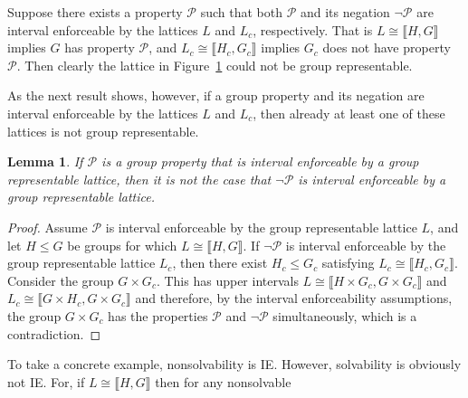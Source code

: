 \documentclass{gen-j-l}
\newcommand{\lb}{\ensuremath{\llbracket}}
\newcommand{\rb}{\ensuremath{\rrbracket}}
\newcommand{\<}{\ensuremath{\langle}}
\renewcommand{\>}{\ensuremath{\rangle}}
\theoremstyle{plain}
\newtheorem{lemma}[theorem]{Lemma}
\theoremstyle{definition}
\theoremstyle{remark}
\numberwithin{theorem}{section}
\numberwithin{claim}{section}
\numberwithin{equation}{section}
\numberwithin{conjecture}{section}
\renewcommand{\leq}{\ensuremath{\leqslant}}
\newcommand{\2}{\ensuremath{\mathbf{2}}}
\newcommand{\3}{\ensuremath{\mathbf{3}}}
\newcommand{\cP}{\ensuremath{\mathcal{P}}}
\newcommand{\IE}{{\small IE}}
\begin{document}
Suppose there exists a property $\cP$ such that both $\cP$ and
its negation $\neg \cP$ are interval enforceable by the lattices $L$ and $L_c$,
respectively.  That is $L\cong \lb H,G \rb$ implies $G$ has property $\cP$, and 
$L_c\cong \lb H_c,G_c \rb$ implies $G_c$ does not have property $\cP$.  
Then clearly the lattice in Figure~\ref{fig:twopanelchute} could not be group
representable.   
\begin{figure}[!h]
  \centering
{}
\caption{}
\label{fig:twopanelchute}  
\end{figure}
As the next result shows, however, if a group property and its
negation are interval enforceable by the lattices $L$ and $L_c$, then already
at least one of these lattices is not group representable.
\begin{lemma}
\label{lemma:ie-prop-and-neg}
  If $\cP$ is a group property that is interval enforceable by a group
  representable lattice, then it is not the case that $\neg \cP$ is interval
  enforceable by a group representable lattice. 
\end{lemma}
\begin{proof}
Assume $\cP$ is 
interval enforceable by the group representable lattice $L$, and let
$H\leq G$ be groups for which $L\cong \lb H, G\rb$.
If $\neg \cP$ is interval enforceable by the group representable
lattice $L_c$, then there exist $H_c\leq G_c$ satisfying
$L_c\cong \lb H_c, G_c\rb$. Consider the group $G\times G_c$. This
has upper intervals $L\cong \lb H\times G_c, G\times G_c \rb$ and 
$L_c\cong \lb G\times H_c, G\times G_c \rb$ and therefore, by the interval
enforceability assumptions,  the group $G\times G_c$ has the properties
$\cP$ and $\neg \cP$ simultaneously, which is a contradiction.
\end{proof}
To take a concrete example, nonsolvability is \IE.  However, solvability is
obviously not \IE. For, if $L\cong \lb H, G \rb$ then for any nonsolvable 
\end{document}

